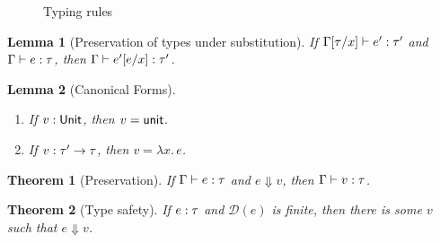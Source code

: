 \documentclass[12pt,a2paper,draft]{article}
\newcommand{\abstr}[2]{\ensuremath{\lambda{#1}.\,{#2}}}
\newcommand{\app}[2]{\ensuremath{{#1}\,{#2}}}
\newcommand{\rec}[2]{\ensuremath{{\normalfont\textsf{rec}}\,{#1}.\,{#2}}}
\newcommand{\unit}{\ensuremath{\normalfont\textsf{unit}}}
\newcommand{\Unit}{\ensuremath{\normalfont\textsf{Unit}}}
\newcommand{\tj}[2]{\mbox{\ensuremath{{#1}:{#2}}}}
\newcommand{\Tj}[3]{\mbox{\ensuremath{{#1}\vdash\tj{#2}{#3}}}}
\newcommand{\tree}[1]{\mathcal{D}(#1)}
\newtheorem{lemma}{Lemma}
\newtheorem{theorem}{Theorem}
\begin{document}
\begin{figure}[htb]
  \centering
  \caption{Typing rules}
  \label{figure:Typing_rules}
\end{figure}

\begin{lemma}[Preservation of types under substitution] \label{lemma:Preservation_of_types_under_substitution}
  If $\Tj{\Gamma[\tau/x]}{e'}{\tau'}$ and $\Tj{\Gamma}{e}{\tau}$,
  then $\Tj{\Gamma}{e'[e/x]}{\tau'}$.
\end{lemma}

\begin{lemma}[Canonical Forms] \label{lemma:Canonical_Forms} \
  \begin{enumerate}
  \item If $\tj{v}{\Unit}$, then $v = \unit$.
  \item If $\tj{v}{\tau' \to \tau}$, then $v = \abstr{x}{e}$.
  \end{enumerate}
\end{lemma}

\begin{theorem}[Preservation] \label{theorem:Preservation}
  If $\Tj{\Gamma}{e}{\tau}$ and $e \Downarrow v$, then $\Tj{\Gamma}{v}{\tau}$.
\end{theorem}

\begin{theorem}[Type safety]
  If $\tj{e}{\tau}$ and $\tree{e}$ is finite, then there is some $v$ such that $e \Downarrow v$.
\end{theorem}
\end{document}
